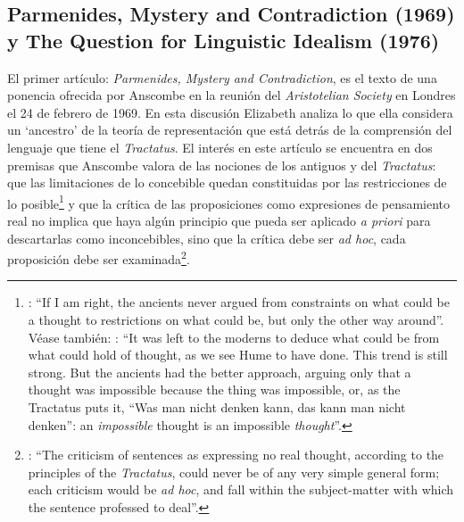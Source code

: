 \subsection{Parmenides, Mystery and Contradiction (1969) y The Question for Linguistic Idealism (1976)}
El primer artículo: \emph{Parmenides, Mystery and Contradiction}, es el texto de una ponencia ofrecida por Anscombe en la reunión del \emph{Aristotelian Society} en Londres el 24 de febrero de 1969. En esta discusión Elizabeth analiza lo que ella considera un `ancestro' de la teoría de representación que está detrás de la comprensión del lenguaje que tiene el \emph{Tractatus}. El interés en este artículo se encuentra en dos premisas que Anscombe valora de las nociones de los antiguos y del \emph{Tractatus}: que las limitaciones de lo concebible quedan constituidas por las restricciones de lo posible\footnote{\Cite[Cf.][viii]{anscombe1981parmenides}: \enquote{If I am right, the ancients never argued from constraints on what could be a thought to restrictions on what could be, but only the other way around}. Véase también: \cite[xi]{anscombe1981parmenides}: \enquote{It was left to the moderns to deduce what could be from what could hold of thought, as we see Hume to have done. This trend is still strong. But the ancients had the better approach, arguing only that a thought was impossible because the thing was impossible, or, as the Tractatus puts it, ``Was man nicht denken kann, das kann man nicht denken'': an \emph{impossible} thought is an impossible \emph{thought}}.} y que la crítica de las proposiciones como expresiones de pensamiento real no implica que haya algún principio que pueda ser aplicado \emph{a priori} para descartarlas como inconcebibles, sino que la crítica debe ser \emph{ad hoc}, cada proposición debe ser examinada\footnote{\Cite[Cf.][151]{anscombe1959iwt}: \enquote{The criticism of sentences as expressing no real thought, according to the principles of the \emph{Tractatus}, could never be of any very simple general form; each criticism would be \emph{ad hoc}, and fall within the subject-matter with which the sentence professed to deal}.}.

